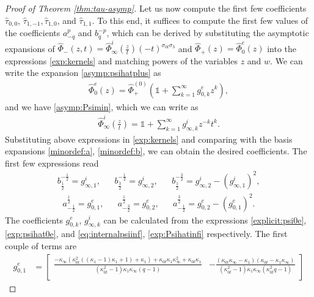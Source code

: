 \documentclass[a4paper,reqno,11pt]{amsart}
\numberwithin{equation}{section}
\numberwithin{figure}{section}
\theoremstyle{plain}
\theoremstyle{remark}
\numberwithin{rhp}{section}
\begin{document}
\begin{proof}[Proof of Theorem \ref{thm:tau-asymp}]
Let us now compute the first few coefficients $\widehat{\tau}_{0,0}$, $\widehat{\tau}_{1,-1}, \widehat{\tau}_{1,0}$, and $\widehat{\tau}_{1,1}$. To this end, it suffices to compute the first few values of the coefficients $a^{p}_{-q}$ and $b^{-p}_q$, which can be derived by substituting the asymptotic expansions of $\widehat{\Phi}_{-}(z,t) = \widehat{\Phi}_{\infty}^{i}\left(\frac{z}{t}\right) (-t)^{\sigma_{0t} \sigma_3}$ and $\widehat{\Phi}_{+}(z) = \widehat{\Phi}_{0}^{e}(z)$ into the expressions \eqref{exp:kernels} and matching powers of the variables $z$ and $w$. We can write the expansion \eqref{asymp:psihatplus} as
\begin{align}
    \widehat{\Phi}_{0}^{e}(z) = \widehat{\Phi}_{+}^{(0)}\left(\mathbb{1} + \sum_{k=1}^{\infty} g^{e}_{0,k} z^k\right), 
\end{align}
and we have \eqref{asymp:Psimin}, which we can write as
\begin{align}
     \widehat{\Phi}_{\infty}^{i}\left(\frac{z}{t} \right) = \mathbb{1} + \sum_{k=1}^{\infty} g^{i}_{\infty,k} z^{-k} t^{k}.
\end{align}
Substituting above expressions in \eqref{exp:kernels} and comparing with the basis expansions \eqref{minordef:a}, \eqref{minordef:b}, we can obtain the desired coefficients. The first few expressions read
\begin{align}
    b_{\frac{1}{2}}^{-\frac{1}{2}} = g_{\infty,1}^{i}, &&b_{\frac{3}{2}}^{-\frac{1}{2}}= g_{\infty,2}^{i}, &&  b^{-\frac{3}{2}}_{\frac{1}{2}} = g_{\infty,2}^{i} - \left( g_{\infty,1}^{i}\right)^2,
\end{align}
\begin{align}
    a^{\frac{1}{2}}_{-\frac{1}{2}} = g_{0,1}^e, &&a^{\frac{1}{2}}_{-\frac{3}{2}} = g_{0,2}^e, && a^{\frac{3}{2}}_{-\frac{1}{2}}= g_{0,2}^e - \left( g_{0,1}^e \right)^2.
\end{align}
The coefficients $g^{e}_{0,k}$, $g^{i}_{\infty,k}$ can be calculated from the expressions \eqref{explicit:psi0e}, \eqref{exp:psihat0e}, and \eqref{eq:internalpsiinf}, \eqref{exp:Psihatinfi} respectively. The first couple of terms are 
\begin{align}
    g_{0,1}^e &= \begin{bmatrix}
 \frac{-\kappa_{\infty} \left(\kappa_{0t}^2 ((\kappa_{1}-1) \kappa_{1}+1)+\kappa_{1}\right)+\kappa_{0t} \kappa_{1} \kappa_{\infty}^2+\kappa_{0t} \kappa_{1}}{\left(\kappa_{0t}^2-1\right) \kappa_{1} \kappa_{\infty} (q-1)} & -\frac{(\kappa_{0t} \kappa_{\infty}-\kappa_{1}) (\kappa_{0t}-\kappa_{1} \kappa_{\infty})}{\left(\kappa_{0t}^2-1\right) \kappa_{1} \kappa_{\infty} \left(\kappa_{0t}^2 q-1\right)} \\

\end{bmatrix}
\end{align}
\end{proof}
\end{document}
